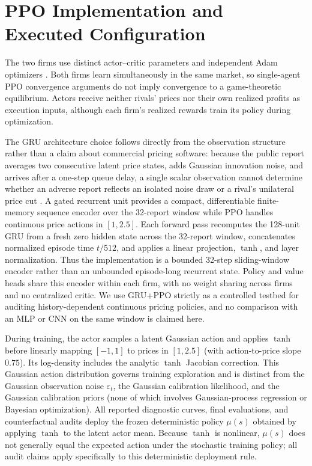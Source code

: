 \section{PPO Implementation and Executed Configuration}

The two firms use distinct actor--critic parameters and independent Adam optimizers \citep{schulman2017proximal}. Both firms learn simultaneously in the same market, so single-agent PPO convergence arguments do not imply convergence to a game-theoretic equilibrium. Actors receive neither rivals' prices nor their own realized profits as execution inputs, although each firm's realized rewards train its policy during optimization.

The GRU architecture choice follows directly from the observation structure rather than a claim about commercial pricing software: because the public report averages two consecutive latent price states, adds Gaussian innovation noise, and arrives after a one-step queue delay, a single scalar observation cannot determine whether an adverse report reflects an isolated noise draw or a rival's unilateral price cut \citep{green1984noncooperative, calvano2021algorithmic}. A gated recurrent unit \citep{cho2014gru} provides a compact, differentiable finite-memory sequence encoder over the 32-report window while PPO handles continuous price actions in $[1,2.5]$. Each forward pass recomputes the 128-unit GRU from a fresh zero hidden state across the 32-report window, concatenates normalized episode time $t/512$, and applies a linear projection, $\tanh$, and layer normalization. Thus the implementation is a bounded 32-step sliding-window encoder rather than an unbounded episode-long recurrent state. Policy and value heads share this encoder within each firm, with no weight sharing across firms and no centralized critic. We use GRU+PPO strictly as a controlled testbed for auditing history-dependent continuous pricing policies, and no comparison with an MLP or CNN on the same window is claimed here.

During training, the actor samples a latent Gaussian action and applies $\tanh$ before linearly mapping $[-1,1]$ to prices in $[1,2.5]$ (with action-to-price slope $0.75$). Its log-density includes the analytic $\tanh$ Jacobian correction. This Gaussian action distribution governs training exploration and is distinct from the Gaussian observation noise $\varepsilon_t$, the Gaussian calibration likelihood, and the Gaussian calibration priors (none of which involves Gaussian-process regression or Bayesian optimization). All reported diagnostic curves, final evaluations, and counterfactual audits deploy the frozen deterministic policy $\mu(s)$ obtained by applying $\tanh$ to the latent actor mean. Because $\tanh$ is nonlinear, $\mu(s)$ does not generally equal the expected action under the stochastic training policy; all audit claims apply specifically to this deterministic deployment rule.

